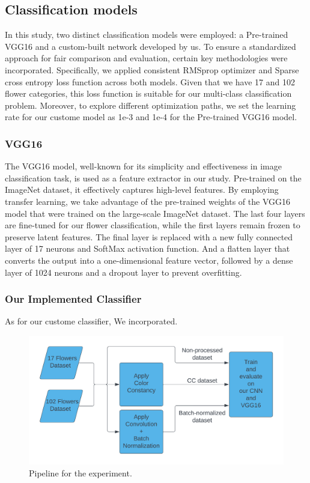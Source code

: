 \subsection{Classification models}

In this study, two distinct classification models were employed: a Pre-trained VGG16 and a custom-built network developed by us. 
To ensure a standardized approach for fair comparison and evaluation, certain key methodologies were incorporated. 
Specifically, we applied consistent RMSprop optimizer and Sparse cross entropy loss function across both models.
Given that we have 17 and 102 flower categories, this loss function is suitable for our multi-class classification problem. Moreover, to explore different optimization paths, we set the learning rate 
for our custome model as 1e-3 and 1e-4 for the Pre-trained VGG16 model. 

\subsubsection{VGG16}

The VGG16 model, well-known for its simplicity and effectiveness in image classification task, is used as a feature extractor in our study. Pre-trained on the ImageNet dataset, it effectively captures high-level features. 
By employing transfer learning, we take advantage of the pre-trained weights of the VGG16 model that were trained on the large-scale ImageNet dataset. 
The last four layers are fine-tuned for our flower classification, while the first layers remain frozen to preserve latent features. The final layer is replaced with a new fully connected layer of 17 neurons and SoftMax activation function. 
And a flatten layer that converts the output into a one-dimensional feature vector, followed by a dense layer of 1024 neurons and a dropout layer to prevent overfitting. 

\subsubsection{Our Implemented Classifier}

As for our custome classifier, We incorporated. 

\begin{figure}[ht]
    \centering
    \includegraphics[width=\textwidth]{images/experiment_pipeline.png}
    \caption{Pipeline for the experiment.}
    \label{fig:experiment_pipeline}
\end{figure}

